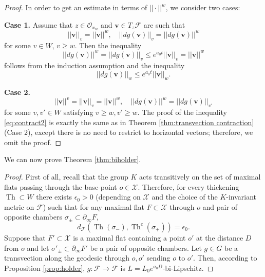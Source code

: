 \documentclass[12pt]{amsbook}%
\theoremstyle{definition}
\theoremstyle{remark}
\numberwithin{section}{chapter}
\numberwithin{subsection}{section}
\numberwithin{figure}{chapter}
\DeclareMathOperator{\Th}{Th}
\def\eps{\epsilon}
\def\cF{{\mathscr{F}}}
\def\cO{{\mathscr{O}}}
\def\cX{{\mathscr{X}}}
\def\bv{\mathbf{v}}
\def\geo{\partial_\infty}
\begin{document}
{{\begin{proof}
In order to get an estimate in terms of $||\cdot||^w$, we consider two cases:  

\medskip 
{\bf Case 1.} Assume that $z\in \cO_{x_w}$ and $\bv\in T_z\cF$ are such that  
$$
||\bv||_v= ||\bv||^w, \quad ||dg(\bv)||_v= ||dg(\bv)||^w 
$$
for some $v\in W$, $v\ge w$. Then the inequality
\begin{equation}\label{eq:contract2} 
||dg(\bv)||^w= ||dg (\bv)||_v\leqslant  e^{a_{0} t} ||\bv||_v =||\bv||^w
\end{equation}
follows from the induction assumption and the inequality
$$
 ||dg (\bv)||_w\leqslant  e^{a_{0} t} ||\bv||_w. 
$$

\medskip 
{\bf Case 2.} 
$$
||\bv||^v= ||\bv||_v= ||\bv||^w, \quad ||dg(\bv)||^w= ||dg(\bv)||_{v'} 
$$
for some $v, v'\in W$ satisfying $v\ge w, v'\ge w$. The proof of the inequality \eqref{eq:contract2} is exactly the same as in Theorem \ref{thm:transvection contraction} (Case 2), except there is no need to restrict to  horizontal vectors; therefore, we omit the proof. 
\end{proof}

We can now prove Theorem \ref{thm:biholder}. 

\begin{proof}
First of all, recall that the group $K$ acts transitively on the set of maximal flats passing through the base-point $o\in \cX$. Therefore, for every thickening $\Th\subset W$ there exists $\eps_0>0$ 
(depending on $\cX$ and the choice of the $K$-invariant metric on $\cF$) such that for any maximal flat $F\subset \cX$ through $o$ and pair of opposite chambers $\sigma_\pm\subset \geo F$, 
$$
d_{\cF}(\Th(\sigma_-), \Th^{c}(\sigma_+))=\eps_0. 
$$ 
Suppose that $F'\subset \cX$ is a maximal flat containing a point $o'$ at the distance $D$ from $o$ and let $\sigma'_\pm\subset \geo F'$ be a pair of opposite chambers. Let $g\in G$ be a transvection along the geodesic through $o, o'$ sending $o$ to $o'$. Then, according to Proposition \ref{prop:holder}, $g: \cF\to \cF$ is $L= L_0e^{a_0 D}$-bi-Lipschitz.    


\end{proof}}}
\end{document}
